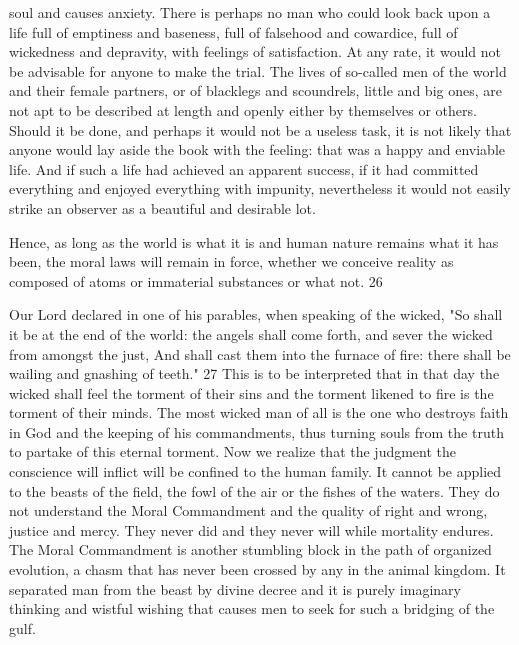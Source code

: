 soul and causes anxiety. There is perhaps no man who could look back upon a life full of
emptiness and baseness, full of falsehood and cowardice, full of wickedness and depravity,
with feelings of satisfaction. At any rate, it would not be advisable for anyone to make the
trial. The lives of so-called men of the world and their female partners, or of blacklegs and
scoundrels, little and big ones, are not apt to be described at length and openly either by
themselves or others. Should it be done, and perhaps it would not be a useless task, it is not
likely that anyone would lay aside the book with the feeling: that was a happy and enviable
life. And if such a life had achieved an apparent success, if it had committed everything and
enjoyed everything with impunity, nevertheless it would not easily strike an observer as a
beautiful and desirable lot.

Hence, as long as the world is what it is and human nature remains what it has been, the
moral laws will remain in force, whether we conceive reality as composed of atoms or
immaterial substances or what not. 26

Our Lord declared in one of his parables, when speaking of the wicked, "So shall it be at the
end of the world: the angels shall come forth, and sever the wicked from amongst the just,
And shall cast them into the furnace of fire: there shall be wailing and gnashing of teeth." 27
This is to be interpreted that in that day the wicked shall feel the torment of their sins and the
torment likened to fire is the torment of their minds. The most wicked man of all is the one
who destroys faith in God and the keeping of his commandments, thus turning souls from the
truth to partake of this eternal torment. Now we realize that the judgment the conscience will
inflict will be confined to the human family. It cannot be applied to the beasts of the field, the
fowl of the air or the fishes of the waters. They do not understand the Moral Commandment
and the quality of right and wrong, justice and mercy. They never did and they never will
while mortality endures. The Moral Commandment is another stumbling block in the path of
organized evolution, a chasm that has never been crossed by any in the animal kingdom. It
separated man from the beast by divine decree and it is purely imaginary thinking and wistful
wishing that causes men to seek for such a bridging of the gulf.

